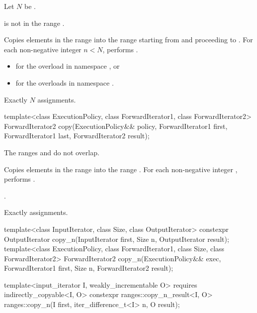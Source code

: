 \begin{itemdescr}
\pnum
Let $N$ be .

\pnum
\expects
{} is not in the range .

\pnum
\effects
Copies elements in the range 
into the range 
starting from  and proceeding to .
For each non-negative integer $n < N$,
performs .

\pnum
\returns
\begin{itemize}
\item
   for the overload in namespace , or
\item
   for the overloads in namespace .
\end{itemize}

\pnum
\complexity
Exactly $N$ assignments.
\end{itemdescr}

%
\begin{itemdecl}
template<class ExecutionPolicy, class ForwardIterator1, class ForwardIterator2>
  ForwardIterator2 copy(ExecutionPolicy&& policy,
                        ForwardIterator1 first, ForwardIterator1 last,
                        ForwardIterator2 result);
\end{itemdecl}

\begin{itemdescr}
\pnum
\expects
The ranges  and 
do not overlap.

\pnum
\effects
Copies elements in the range 
into the range .
For each non-negative integer ,
performs .

\pnum
\returns
{}.

\pnum
\complexity
Exactly  assignments.
\end{itemdescr}

%
\begin{itemdecl}
template<class InputIterator, class Size, class OutputIterator>
  constexpr OutputIterator copy_n(InputIterator first, Size n,
                                  OutputIterator result);
template<class ExecutionPolicy, class ForwardIterator1, class Size, class ForwardIterator2>
  ForwardIterator2 copy_n(ExecutionPolicy&& exec,
                          ForwardIterator1 first, Size n,
                          ForwardIterator2 result);

template<input_iterator I, weakly_incrementable O>
  requires indirectly_copyable<I, O>
  constexpr ranges::copy_n_result<I, O>
    ranges::copy_n(I first, iter_difference_t<I> n, O result);
\end{itemdecl}

